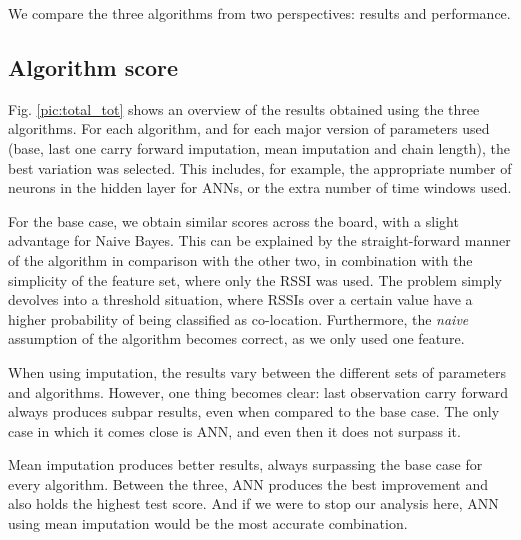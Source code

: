 We compare the three algorithms from two perspectives: results and performance.

\subsection{Algorithm score}

Fig. \ref{pic:total_tot} shows an overview of the results obtained using the three algorithms. For each algorithm, and for each major version of parameters used (base, last one carry forward imputation, mean imputation and chain length), the best variation was selected. This includes, for example, the appropriate number of neurons in the hidden layer for ANNs, or the extra number of time windows used. 

For the base case, we obtain similar scores across the board, with a slight advantage for Naive Bayes. This can be explained by the straight-forward manner of the algorithm in comparison with the other two, in combination with the simplicity of the feature set, where only the RSSI was used. The problem simply devolves into a threshold situation, where RSSIs over a certain value have a higher probability of being classified as co-location. Furthermore, the \textit{naive} assumption of the algorithm becomes correct, as we only used one feature.

When using imputation, the results vary between the different sets of parameters and algorithms. However, one thing becomes clear: last observation carry forward always produces subpar results, even when compared to the base case. The only case in which it comes close is ANN, and even then it does not surpass it. 

Mean imputation produces better results, always surpassing the base case for every algorithm. Between the three, ANN produces the best improvement and also holds the highest test score. And if we were to stop our analysis here, ANN using mean imputation would be the most accurate combination.  


